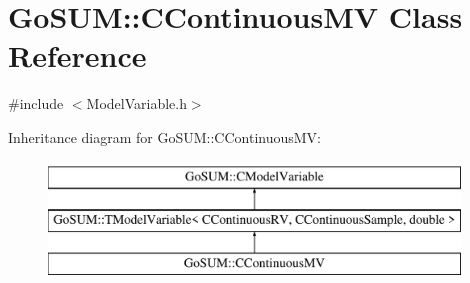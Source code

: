\hypertarget{class_go_s_u_m_1_1_c_continuous_m_v}{\section{Go\-S\-U\-M\-:\-:C\-Continuous\-M\-V Class Reference}
\label{class_go_s_u_m_1_1_c_continuous_m_v}
}


{\ttfamily \#include $<$Model\-Variable.\-h$>$}

Inheritance diagram for Go\-S\-U\-M\-:\-:C\-Continuous\-M\-V\-:\begin{figure}[H]
\begin{center}
\leavevmode
\includegraphics[height=3.000000cm]{class_go_s_u_m_1_1_c_continuous_m_v}
\end{center}
\end{figure}
